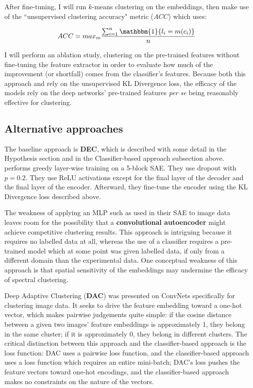 \documentclass{article}
\begin{document}
After fine-tuning, I will run $k$-means clustering on the embeddings, then make use of the ``unsupervised clustering accuracy" metric ($ACC$) which \cite{xie2016unsupervised} uses:

$$
ACC = max_m \frac{\sum_{i=1}^n \mathbbm{1}\{l_i = m(c_i)\}}{n}
$$

I will perform an ablation study, clustering on the pre-trained features without fine-tuning the feature extractor in order to evaluate how much of the improvement (or shortfall) comes from the classifier's features. Because both this approach and \cite{xie2016unsupervised} rely on the unsupervised KL Divergence loss, the efficacy of the models rely on the deep networks' pre-trained features \textit{per se} being reasonably effective for clustering.

\subsection{Alternative approaches}

The baseline approach is \textbf{DEC}, which is described with some detail in the Hypothesis section and in the Classifier-based approach subsection above. \cite{xie2016unsupervised} performs greedy layer-wise training on a 5-block SAE. They use dropout with $p=0.2$. They use ReLU activations except for the final layer of the decoder and the final layer of the encoder. Afterward, they fine-tune the encoder using the KL Divergence loss described above.

The weakness of applying an MLP such as \cite{xie2016unsupervised} used in their SAE to image data leaves room for the possibility that a \textbf{convolutional autoencoder} \cite{masci2011stacked} might achieve competitive clustering results. This approach is intriguing because it requires no labelled data at all, whereas the use of a classifier requires a pre-trained model which at some point was given labelled data, if only from a different domain than the experimental data. One conceptual weakness of this approach is that spatial sensitivity of the embeddings may undermine the efficacy of spectral clustering.

Deep Adaptive Clustering (\textbf{DAC}) \cite{chang2017deep} was presented on ConvNets specifically for clustering image data. It seeks to drive the feature embedding toward a one-hot vector, which makes pairwise judgements quite simple: if the cosine distance between a given two images' feature embeddings is approximately 1, they belong in the same cluster; if it is approximately 0, they belong in different clusters. The critical distinction between this approach and the classifier-based approach is the loss function: DAC uses a pairwise loss function, and the classifier-based approach uses a loss function which requires an entire mini-batch; DAC's loss pushes the feature vectors toward one-hot encodings, and the classifier-based approach makes no constraints on the nature of the vectors.



\end{document}
